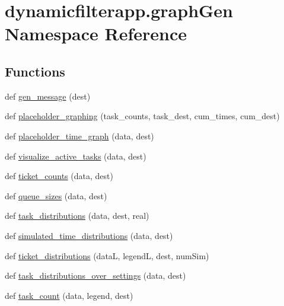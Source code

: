 \hypertarget{namespacedynamicfilterapp_1_1graph_gen}{}\section{dynamicfilterapp.\+graph\+Gen Namespace Reference}
\label{namespacedynamicfilterapp_1_1graph_gen}
\subsection*{Functions}
\begin{DoxyCompactItemize}
\item 
def \hyperlink{namespacedynamicfilterapp_1_1graph_gen_a64d150f32e0559d2ca96e9a2db637fd4}{gen\+\_\+message} (dest)
\item 
def \hyperlink{namespacedynamicfilterapp_1_1graph_gen_aa390916522804b2486fb15d5af94c93a}{placeholder\+\_\+graphing} (task\+\_\+counts, task\+\_\+dest, cum\+\_\+times, cum\+\_\+dest)
\item 
def \hyperlink{namespacedynamicfilterapp_1_1graph_gen_a96ba3683ba7bda319710d14f7a3e923d}{placeholder\+\_\+time\+\_\+graph} (data, dest)
\item 
def \hyperlink{namespacedynamicfilterapp_1_1graph_gen_a6cbfcba30770fe88d3861ce90330a3a9}{visualize\+\_\+active\+\_\+tasks} (data, dest)
\item 
def \hyperlink{namespacedynamicfilterapp_1_1graph_gen_ade6ccfe6b14b9f3fa663d9f6cd2898b4}{ticket\+\_\+counts} (data, dest)
\item 
def \hyperlink{namespacedynamicfilterapp_1_1graph_gen_a209f6a234ddb6528b7c7df731a0bd5ed}{queue\+\_\+sizes} (data, dest)
\item 
def \hyperlink{namespacedynamicfilterapp_1_1graph_gen_afba42249a248ae8c7af2cfaea3b37c6c}{task\+\_\+distributions} (data, dest, real)
\item 
def \hyperlink{namespacedynamicfilterapp_1_1graph_gen_a50af14aa0304c1716efb3f629e2655b4}{simulated\+\_\+time\+\_\+distributions} (data, dest)
\item 
def \hyperlink{namespacedynamicfilterapp_1_1graph_gen_a5b53dfee6e695f00b609c9f39978803b}{ticket\+\_\+distributions} (dataL, legendL, dest, num\+Sim)
\item 
def \hyperlink{namespacedynamicfilterapp_1_1graph_gen_aec5e69baf371fabab25fac24c7df5d15}{task\+\_\+distributions\+\_\+over\+\_\+settings} (data, dest)
\item 
def \hyperlink{namespacedynamicfilterapp_1_1graph_gen_a8db1f76661e4aea8b1d2145681ae2696}{task\+\_\+count} (data, legend, dest)

\end{DoxyCompactItemize}
